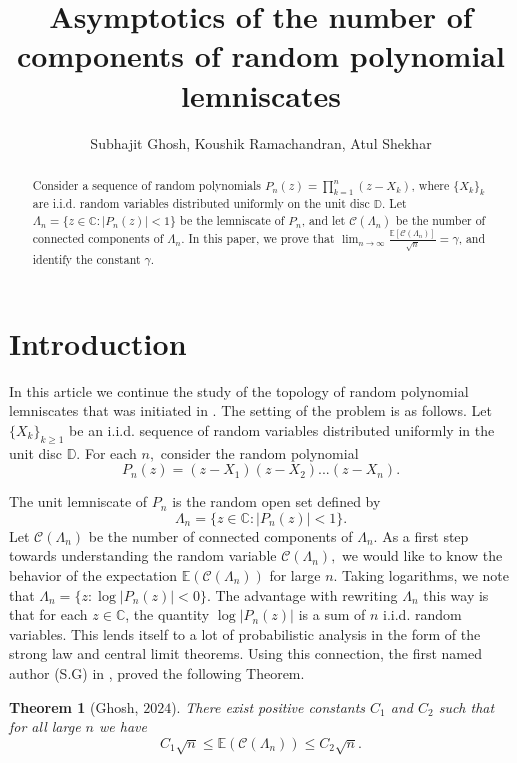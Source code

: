 \documentclass[9pt,a4paper,reqno]{amsart}
\title[Number of components of random lemniscates]{Asymptotics of the number of components of random polynomial lemniscates}
\author{Subhajit Ghosh, Koushik Ramachandran, Atul Shekhar }
\newcommand{\C}{{\mathbb{C}}}
\newcommand{\D}{{\mathbb{D}}}
\newcommand{\E}{{\mathbb{E}}}
\theoremstyle{mine}
\newtheorem{thm}{Theorem}[section]
\theoremstyle{definition}
\theoremstyle{remark}
\begin{document}
\begin{abstract}
    Consider a sequence of random polynomials $P_n(z) = \prod_{k=1}^{n}(z - X_k)$, where $\{X_k\}_k$ are i.i.d. random variables distributed uniformly on the unit disc $\D$. Let $\Lambda_n = \{z \in \C:  |P_n(z)| < 1\}$ be the lemniscate of $P_n$, and let $\mathscr{C}(\Lambda_n)$ be the number of connected components of $\Lambda_n$. In this paper, we prove that $\lim_{n\to\infty}\frac{\E[\mathscr{C}(\Lambda_n)]}{\sqrt{n}}= \gamma$, and identify the constant $\gamma$.\\ 
\end{abstract}

\maketitle

\section{Introduction}\label{sec1}
In this article we continue the study of the topology of  random polynomial lemniscates that was initiated in \cite{Ghosh-numberofcomponents}. The setting of the problem is as follows. Let $\{X_k\}_{k\geq 1 }$ be an i.i.d. sequence of random variables distributed uniformly in the unit disc $\mathbb{D}$. For each $n,$ consider the random polynomial
\[P_n(z) = (z-X_1)(z-X_2)...(z-X_n).\] 


 
The unit lemniscate of $P_n$ is the random open set defined by \[\Lambda_n = \{z \in \C:  |P_n(z)| < 1\}.\] 
Let $\mathscr{C}(\Lambda_n)$ be the number of connected components of $\Lambda_n$. As a first step towards understanding the random variable $\mathscr{C}(\Lambda_n),$ we would like to know the behavior of the expectation $\E(\mathscr{C}(\Lambda_n))$ for large $n$. Taking logarithms, we note that $\Lambda_n = \{z: \log|P_n(z)| < 0\}$. The advantage with rewriting $\Lambda_n$ this way is that for each $z\in\C$, the quantity $\log|P_n(z)|$ is a sum of $n$ i.i.d. random variables. This lends itself to a lot of probabilistic analysis in the form of the strong law and central limit theorems. Using this connection, the first named author (S.G) in \cite{Ghosh-numberofcomponents}, proved the following Theorem.

\begin{thm}[Ghosh, $2024$]\label{Basic result}
There exist positive constants $C_1$ and $ C_2$ such that for all large $n$ we have
\[C_1\sqrt{n}\leq \E(\mathscr{C}(\Lambda_n))\leq C_2\sqrt{n}.\]
\end{thm} 
\end{document}
